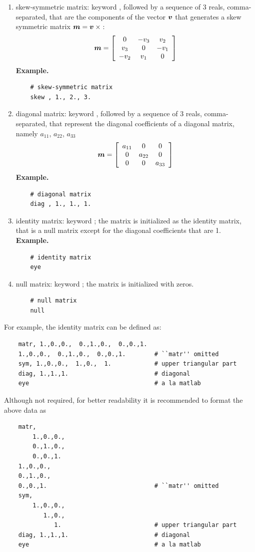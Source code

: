 \begin{enumerate}
    \item skew-symmetric matrix: keyword , followed by a sequence
    of 3 reals, comma-separated, that are the components of the vector $\T{v}$
    that generates a skew symmetric matrix $\T{m}=\T{v}\times{}$:
\begin{equation}
	\T{m} = \sqbr{\matr{ccc}{
		0 & -v_3 & v_2 \\
		v_3 & 0 & -v_1 \\
		-v_2 & v_1 & 0
	}}
\end{equation}
\textbf{Example.}
\begin{verbatim}
    # skew-symmetric matrix
    skew , 1., 2., 3.
\end{verbatim}

    \item diagonal matrix: keyword , followed by a sequence
    of 3 reals, comma-separated, that represent the diagonal coefficients 
    of a diagonal matrix, namely $a_{11}$, $a_{22}$, $a_{33}$
\begin{equation}
	\T{m} = \sqbr{\matr{ccc}{
		a_{11} & 0 & 0 \\
		0 & a_{22} & 0 \\
		0 & 0 & a_{33}
	}}
\end{equation}
\textbf{Example.}
\begin{verbatim}
    # diagonal matrix
    diag , 1., 1., 1.
\end{verbatim}

    \item identity matrix: keyword ; the matrix is initialized
    as the identity matrix, that is a null matrix except for the diagonal 
    coefficients that are 1.
\textbf{Example.}
\begin{verbatim}
    # identity matrix
    eye
\end{verbatim}

    \item null matrix: keyword ; the matrix is initialized 
    with zeros.
\begin{verbatim}
    # null matrix
    null 
\end{verbatim}

\end{enumerate}
For example, the identity matrix can be defined as:
\begin{verbatim}
    matr, 1.,0.,0.,  0.,1.,0.,  0.,0.,1.
    1.,0.,0.,  0.,1.,0.,  0.,0.,1.        # ``matr'' omitted
    sym, 1.,0.,0.,  1.,0.,  1.            # upper triangular part
    diag, 1.,1.,1.                        # diagonal
    eye                                   # a la matlab
\end{verbatim}
Although not required, for better readability it is recommended to format
the above data as
\begin{verbatim}
    matr,
        1.,0.,0.,
        0.,1.,0.,
        0.,0.,1.
    1.,0.,0.,
    0.,1.,0.,
    0.,0.,1.                              # ``matr'' omitted
    sym,
        1.,0.,0.,
           1.,0.,
              1.                          # upper triangular part
    diag, 1.,1.,1.                        # diagonal
    eye                                   # a la matlab
\end{verbatim}

